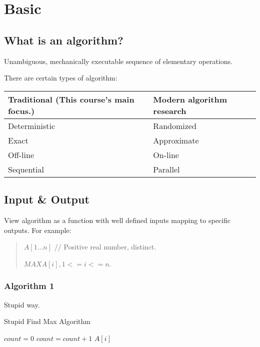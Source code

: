 \section{Basic}
\subsection{What is an algorithm?}
Unambiguous, mechanically executable sequence of elementary operations.

There are certain types of algorithm:

\begin{tabular}{ ll }
Traditional (This course’s main focus.) & Modern algorithm research\\
\hline
Deterministic & Randomized \\
Exact & Approximate\\
Off-line & On-line\\
Sequential & Parallel\\
\end{tabular}

\subsection{Input \& Output}

View algorithm as a function with well defined inputs mapping to specific
outputs. For example:

\begin{quote}

\AlgoInput $A[1...n]$  // Positive real number, distinct.

\AlgoOutput $MAX A[i], 1<= i <= n$.

\end{quote}

\subsubsection{Algorithm 1}

Stupid way.

\begin{algorithm}[H]
\caption{Stupid Find Max Algorithm}\label{Stupid_Find_Max_Algorithm}
\begin{algorithmic}[1]
  \State $count = 0$
      \State $count = count + 1$
    \EndIf
  \EndFor
    \Return $A[i]$
  \EndIf
\EndFor
\EndProcedure
\end{algorithmic}
\end{algorithm}


